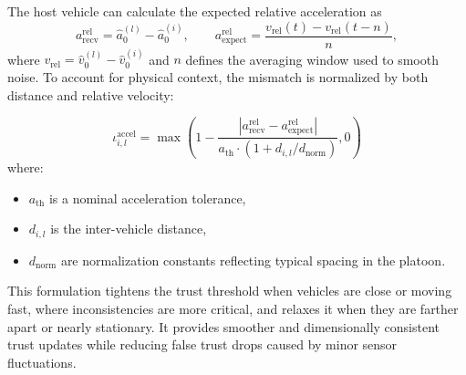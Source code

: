 The host vehicle can calculate the expected relative acceleration as 
\[
a_{\text{recv}}^{\text{rel}} = \hat{a}_0^{(l)} - \hat{a}_0^{(i)}, \qquad
a_{\text{expect}}^{\text{rel}} = \frac{v_{\text{rel}}(t) - v_{\text{rel}}(t-n)}{n},
\]
where \(v_{\text{rel}} = \hat{v}_0^{(l)} - \hat{v}_0^{(i)}\) and \(n\) defines the averaging window used to smooth noise.
To account for physical context, the mismatch is normalized by both distance and relative velocity:

\begin{equation}
    \iota_{i,l}^{\text{accel}} = \max\left(1 - 
    \frac{|a_{\text{recv}}^{\text{rel}} - a_{\text{expect}}^{\text{rel}}|}
    {a_{\text{th}} \cdot (1 + d_{i,l}/d_{\text{norm}})}, 0\right)
\end{equation}
where:

\begin{itemize}
\item \(a_{\text{th}}\) is a nominal acceleration tolerance,
\item \(d_{i,l}\) is the inter-vehicle distance,
\item \(d_{\text{norm}}\) are normalization constants reflecting typical spacing in the platoon.
\end{itemize}
This formulation tightens the trust threshold when vehicles are close or moving fast, where inconsistencies are more critical, and relaxes it when they are farther apart or nearly stationary. It provides smoother and dimensionally consistent trust updates while reducing false trust drops caused by minor sensor fluctuations.


